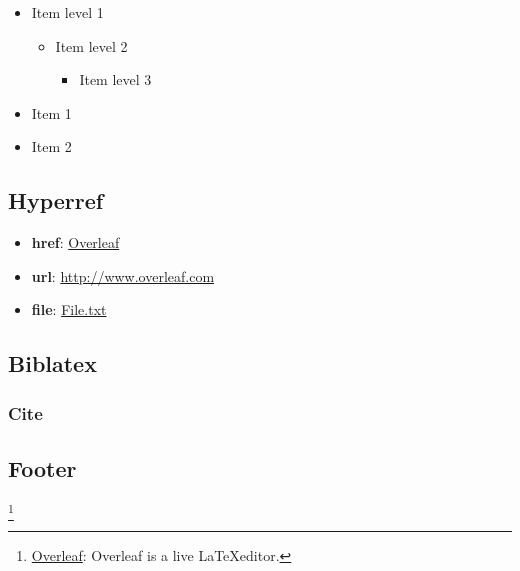 \begin{itemize}
    \item Item level 1
    \begin{itemize}
        \item Item level 2
        \begin{itemize}
            \item Item level 3
        \end{itemize}
    \end{itemize}
    \item[\nierdiamond] Item 1
    \item[\nierarrow] Item 2
\end{itemize}

\subsection{Hyperref}

\begin{itemize}
    \item \textbf{href}: \href{http://www.overleaf.com}{Overleaf}
    \item \textbf{url}: \url{http://www.overleaf.com}
    \item \textbf{file}: \href{run:./file.txt}{File.txt}
\end{itemize}

\subsection{Biblatex}

\subsubsection{Cite}

\lipsum[8]
\cite{RANDOMCITE}
\lipsum[9]

\subsection{Footer}

\lipsum[10]\footnote{\href{https://www.overleaf.com}{Overleaf}: Overleaf is a live \LaTeX editor.}